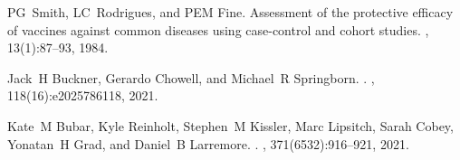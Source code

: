 \documentclass[12pt]{article}
\begin{document}
\begin{thebibliography}{10}
PG~Smith, LC~Rodrigues, and PEM Fine.
\newblock Assessment of the protective efficacy of vaccines against common
  diseases using case-control and cohort studies.
, 13(1):87--93, 1984.

Jack~H Buckner, Gerardo Chowell, and Michael~R Springborn.
.
,
  118(16):e2025786118, 2021.

Kate~M Bubar, Kyle Reinholt, Stephen~M Kissler, Marc Lipsitch, Sarah Cobey,
  Yonatan~H Grad, and Daniel~B Larremore.
.
, 371(6532):916--921, 2021.

\end{thebibliography}
\end{document}
